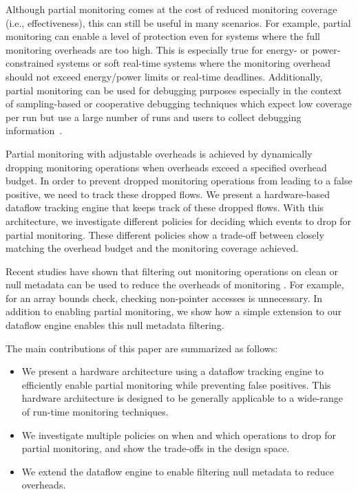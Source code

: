 Although partial monitoring comes at the cost of reduced monitoring coverage (i.e.,
effectiveness), this can still be useful in many scenarios.
For example, partial
monitoring can enable a level of protection even for systems where the full
monitoring overheads are too high. This is especially true for energy- or
power-constrained systems or soft real-time systems where the monitoring
overhead should not exceed energy/power limits or real-time deadlines.
Additionally, partial monitoring can be used for debugging purposes
especially in the context of sampling-based or cooperative debugging techniques
which expect low coverage per run but use a large number of runs and users to
collect debugging information~\cite{liblit-pldi05, chilimbi-asplos04,
greathouse-cgo11}. 

Partial monitoring with adjustable overheads is achieved by dynamically
dropping monitoring operations when overheads exceed a specified overhead
budget.  In order to prevent dropped monitoring operations from leading to a
false positive, we need to track these dropped flows.  We present a
hardware-based dataflow tracking engine that keeps track of these dropped
flows. With this architecture, we investigate different policies for deciding
which events to drop for partial monitoring. These different policies show a
trade-off between closely matching the overhead budget and the monitoring
coverage achieved.

Recent studies have shown that filtering out monitoring operations on clean or null
metadata can be used to reduce the overheads of monitoring \cite{fade-hpca14}.
For example, for an array bounds check, checking non-pointer accesses is
unnecessary. In addition to enabling partial monitoring, we show how a simple
extension to our dataflow engine enables this null metadata filtering.

The main contributions of this paper are summarized as follows:
\begin{itemize}
  \item We present a hardware architecture using a dataflow tracking engine to
  efficiently enable partial monitoring while preventing false positives. This
  hardware architecture is designed to be generally applicable to a wide-range
  of run-time monitoring techniques.
  \item We investigate multiple policies on when and which operations to drop 
  for partial monitoring, and show the trade-offs in the design space.
  \item We extend the dataflow engine to enable filtering null metadata to
  reduce overheads.
\end{itemize}

